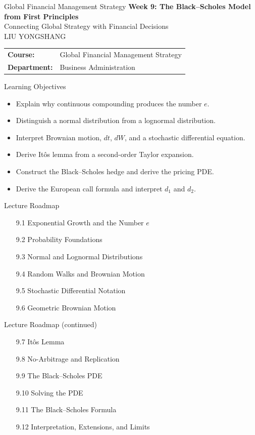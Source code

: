 \documentclass[aspectratio=169]{beamer}
\begin{document}
\begin{frame}[t]{Global Financial Management Strategy}
\centering
\vspace{0.62cm}
{\Large\textbf{Week 9: The Black--Scholes Model from First Principles}}\\[0.5cm]
{\large Connecting Global Strategy with Financial Decisions}\\[0.3cm]
{\normalsize LIU YONGSHANG}\\[0.7cm]
\begin{tabular}{ll}
\textbf{Course:} & Global Financial Management Strategy\\
\textbf{Department:} & Business Administration\\
\end{tabular}
\end{frame}
\begin{frame}[t]{Learning Objectives}
\justifying
\begin{itemize}
\item Explain why continuous compounding produces the number $e$.
\item Distinguish a normal distribution from a lognormal distribution.
\item Interpret Brownian motion, $dt$, $dW$, and a stochastic differential equation.
\item Derive It\^o\textquotesingle s lemma from a second-order Taylor expansion.
\item Construct the Black--Scholes hedge and derive the pricing PDE.
\item Derive the European call formula and interpret $d_1$ and $d_2$.
\end{itemize}
\end{frame}

\begin{frame}[t]{Lecture Roadmap}
\justifying
\begin{enumerate}
\item[9.1] Exponential Growth and the Number $e$
\item[9.2] Probability Foundations
\item[9.3] Normal and Lognormal Distributions
\item[9.4] Random Walks and Brownian Motion
\item[9.5] Stochastic Differential Notation
\item[9.6] Geometric Brownian Motion
\end{enumerate}
\end{frame}

\begin{frame}[t]{Lecture Roadmap (continued)}
\justifying
\begin{enumerate}
\item[9.7] It\^o\textquotesingle s Lemma
\item[9.8] No-Arbitrage and Replication
\item[9.9] The Black--Scholes PDE
\item[9.10] Solving the PDE
\item[9.11] The Black--Scholes Formula
\item[9.12] Interpretation, Extensions, and Limits
\end{enumerate}
\end{frame}
\end{document}
